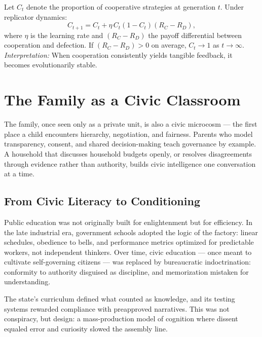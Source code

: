 \documentclass[12pt,twoside]{book}
\begin{document}
\begin{tcolorbox}[colback=gray!5,
  colframe=gray!60,
  boxrule=0.4pt,
  arc=1mm,
  title={Mathematical Interlude: Cooperation as a Stable Learning System},
  enhanced,
  breakable,
  left=5pt,
  right=5pt]
\small
Let $C_t$ denote the proportion of cooperative strategies at generation $t$.  
Under replicator dynamics:
\[
C_{t+1} = C_t + \eta\, C_t(1-C_t)(R_C - R_D),
\]
where $\eta$ is the learning rate and $(R_C - R_D)$ the payoff differential between cooperation and defection.  
If $(R_C - R_D) > 0$ on average, $C_t \to 1$ as $t \to \infty$.  
\textit{Interpretation:} When cooperation consistently yields tangible feedback, it becomes evolutionarily stable.
\end{tcolorbox}

\section{The Family as a Civic Classroom}

The family, once seen only as a private unit, is also a civic microcosm — the first place a child encounters hierarchy, negotiation, and fairness.  
Parents who model transparency, consent, and shared decision-making teach governance by example.  
A household that discusses household budgets openly, or resolves disagreements through evidence rather than authority, builds civic intelligence one conversation at a time.

\subsection*{From Civic Literacy to Conditioning}

Public education was not originally built for enlightenment but for efficiency.  
In the late industrial era, government schools adopted the logic of the factory: linear schedules, obedience to bells, and performance metrics optimized for predictable workers, not independent thinkers.  
Over time, civic education — once meant to cultivate self-governing citizens — was replaced by bureaucratic indoctrination: conformity to authority disguised as discipline, and memorization mistaken for understanding.

The state’s curriculum defined what counted as knowledge, and its testing systems rewarded compliance with preapproved narratives.  
This was not conspiracy, but design: a mass-production model of cognition where dissent equaled error and curiosity slowed the assembly line.
\end{document}
